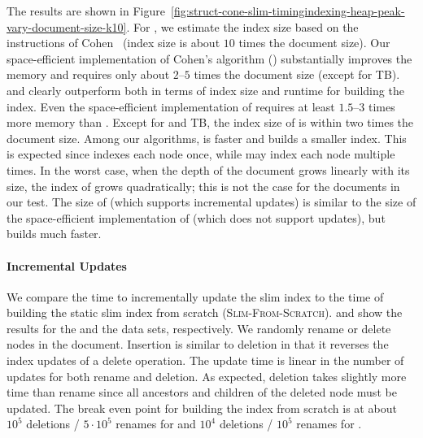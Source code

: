The results are shown in Figure~\ref{fig:struct-cone-slim-timingindexing-heap-peak-vary-document-size-k10}.
%
For \structureplainshort{}, we estimate the index size based on the instructions of Cohen~\cite{cohen-sigmod-2013} (index size is about $10$ times the document size). Our space-efficient implementation of Cohen's algorithm (\structuresearchshort{}) substantially improves the memory and requires only about $2$--$5$ times the document size (except for TB).
%
\coneshort{} and \shinconeshort{} clearly outperform \structuresearchshort{} both in terms of index size and runtime for building the index. Even the space-efficient implementation of \structuresearchshort{} requires at least $1.5$--$3$ times more memory than \shinconeshort{}. Except for \dblp{} and TB, the index size of \shinconeshort{} is within two times the document size.
%
Among our algorithms, \shinconeshort{} is faster and builds a smaller index. This is expected since \shinconeshort{} indexes each node once, while \coneshort{} may index each node multiple times. In the worst case, when the depth of the document grows linearly with its size, the index of \coneshort{} grows quadratically; this is not the case for the documents in our test. The size of \shinconedynshort{} (which supports incremental updates) is similar to the size of the space-efficient implementation of \structuresearchshort{} (which does not support updates), but builds much faster.

\paragraph{Incremental Updates}

We compare the time to incrementally update the slim index to the time of building the static slim index from scratch (\textsc{Slim-From-Scratch}).  and  show the results for the  and the \dblp{} data sets, respectively.
%
We randomly rename or delete nodes in the document. Insertion is similar to deletion in that it reverses the index updates of a delete operation. The update time is linear in the number of updates for both rename and deletion. As expected, deletion takes slightly more time than rename since all ancestors and children of the deleted node must be updated. The break even point for building the index from scratch is at about $10^5$ deletions / $5 \cdot 10^5$ renames for  and $10^4$ deletions / $10^5$ renames for \dblp{}.

